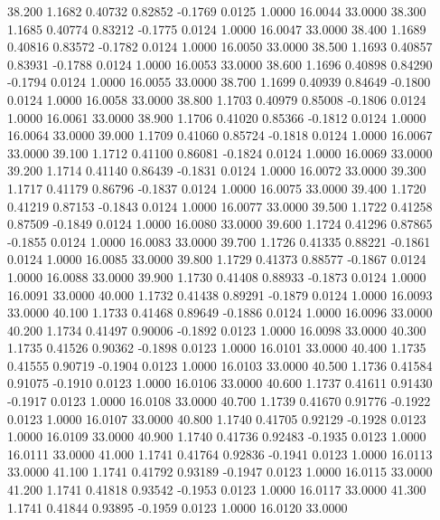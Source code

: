   38.200   1.1682   0.40732   0.82852  -0.1769   0.0125   1.0000  16.0044  33.0000
  38.300   1.1685   0.40774   0.83212  -0.1775   0.0124   1.0000  16.0047  33.0000
  38.400   1.1689   0.40816   0.83572  -0.1782   0.0124   1.0000  16.0050  33.0000
  38.500   1.1693   0.40857   0.83931  -0.1788   0.0124   1.0000  16.0053  33.0000
  38.600   1.1696   0.40898   0.84290  -0.1794   0.0124   1.0000  16.0055  33.0000
  38.700   1.1699   0.40939   0.84649  -0.1800   0.0124   1.0000  16.0058  33.0000
  38.800   1.1703   0.40979   0.85008  -0.1806   0.0124   1.0000  16.0061  33.0000
  38.900   1.1706   0.41020   0.85366  -0.1812   0.0124   1.0000  16.0064  33.0000
  39.000   1.1709   0.41060   0.85724  -0.1818   0.0124   1.0000  16.0067  33.0000
  39.100   1.1712   0.41100   0.86081  -0.1824   0.0124   1.0000  16.0069  33.0000
  39.200   1.1714   0.41140   0.86439  -0.1831   0.0124   1.0000  16.0072  33.0000
  39.300   1.1717   0.41179   0.86796  -0.1837   0.0124   1.0000  16.0075  33.0000
  39.400   1.1720   0.41219   0.87153  -0.1843   0.0124   1.0000  16.0077  33.0000
  39.500   1.1722   0.41258   0.87509  -0.1849   0.0124   1.0000  16.0080  33.0000
  39.600   1.1724   0.41296   0.87865  -0.1855   0.0124   1.0000  16.0083  33.0000
  39.700   1.1726   0.41335   0.88221  -0.1861   0.0124   1.0000  16.0085  33.0000
  39.800   1.1729   0.41373   0.88577  -0.1867   0.0124   1.0000  16.0088  33.0000
  39.900   1.1730   0.41408   0.88933  -0.1873   0.0124   1.0000  16.0091  33.0000
  40.000   1.1732   0.41438   0.89291  -0.1879   0.0124   1.0000  16.0093  33.0000
  40.100   1.1733   0.41468   0.89649  -0.1886   0.0124   1.0000  16.0096  33.0000
  40.200   1.1734   0.41497   0.90006  -0.1892   0.0123   1.0000  16.0098  33.0000
  40.300   1.1735   0.41526   0.90362  -0.1898   0.0123   1.0000  16.0101  33.0000
  40.400   1.1735   0.41555   0.90719  -0.1904   0.0123   1.0000  16.0103  33.0000
  40.500   1.1736   0.41584   0.91075  -0.1910   0.0123   1.0000  16.0106  33.0000
  40.600   1.1737   0.41611   0.91430  -0.1917   0.0123   1.0000  16.0108  33.0000
  40.700   1.1739   0.41670   0.91776  -0.1922   0.0123   1.0000  16.0107  33.0000
  40.800   1.1740   0.41705   0.92129  -0.1928   0.0123   1.0000  16.0109  33.0000
  40.900   1.1740   0.41736   0.92483  -0.1935   0.0123   1.0000  16.0111  33.0000
  41.000   1.1741   0.41764   0.92836  -0.1941   0.0123   1.0000  16.0113  33.0000
  41.100   1.1741   0.41792   0.93189  -0.1947   0.0123   1.0000  16.0115  33.0000
  41.200   1.1741   0.41818   0.93542  -0.1953   0.0123   1.0000  16.0117  33.0000
  41.300   1.1741   0.41844   0.93895  -0.1959   0.0123   1.0000  16.0120  33.0000
